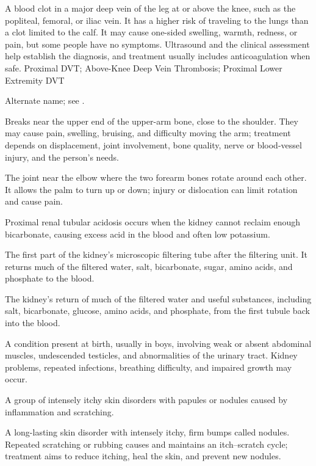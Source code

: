  A blood clot in a major deep vein of the leg at or above the knee, such as the popliteal, femoral, or iliac vein. It has a higher risk of traveling to the lungs than a clot limited to the calf. It may cause one-sided swelling, warmth, redness, or pain, but some people have no symptoms. Ultrasound and the clinical assessment help establish the diagnosis, and treatment usually includes anticoagulation when safe.
\synonyms
Proximal DVT; Above-Knee Deep Vein Thrombosis; Proximal Lower Extremity DVT

 Alternate name; see .

 Breaks near the upper end of the upper-arm bone, close to the shoulder. They may cause pain, swelling, bruising, and difficulty moving the arm; treatment depends on displacement, joint involvement, bone quality, nerve or blood-vessel injury, and the person’s needs.

 The joint near the elbow where the two forearm bones rotate around each other. It allows the palm to turn up or down; injury or dislocation can limit rotation and cause pain.

 Proximal renal tubular acidosis occurs when the kidney cannot reclaim enough bicarbonate, causing excess acid in the blood and often low potassium.

 The first part of the kidney’s microscopic filtering tube after the filtering unit. It returns much of the filtered water, salt, bicarbonate, sugar, amino acids, and phosphate to the blood.

 The kidney’s return of much of the filtered water and useful substances, including salt, bicarbonate, glucose, amino acids, and phosphate, from the first tubule back into the blood.

 A condition present at birth, usually in boys, involving weak or absent abdominal muscles, undescended testicles, and abnormalities of the urinary tract. Kidney problems, repeated infections, breathing difficulty, and impaired growth may occur.

 A group of intensely itchy skin disorders with papules or nodules caused by inflammation and scratching.

 A long-lasting skin disorder with intensely itchy, firm bumps called nodules. Repeated scratching or rubbing causes and maintains an itch--scratch cycle; treatment aims to reduce itching, heal the skin, and prevent new nodules.

